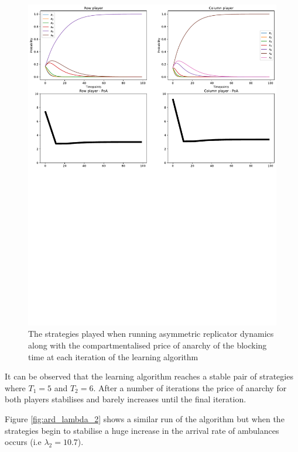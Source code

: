 \begin{figure}[H]
    \includegraphics[width=\textwidth, trim=0 400 0 0]{imgs/asymmetric_rd_and_PoA/asymmetric_original.pdf}
    \caption{The strategies played when running asymmetric replicator dynamics
    along with the compartmentalised price of anarchy of the blocking time at
    each iteration of the learning algorithm}
    \label{fig:ard_original}
\end{figure}

It can be observed that the learning algorithm reaches a stable pair of 
strategies where \(T_1 = 5\) and \(T_2 = 6\). After a number of iterations the
price of anarchy for both players stabilises and barely increases until the 
final iteration. 

Figure \ref{fig:ard_lambda_2} shows a similar run of the
algorithm but when the strategies begin to stabilise a huge increase in the
arrival rate of ambulances occurs (i.e \( \lambda_2 = 10.7 \)).



